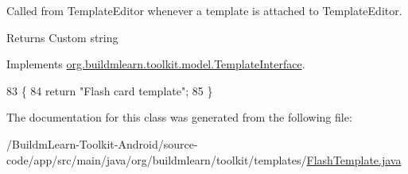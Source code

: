 Called from Template\-Editor whenever a template is attached to Template\-Editor. 

\begin{DoxyReturn}{Returns}
Custom string 
\end{DoxyReturn}


Implements \hyperlink{interfaceorg_1_1buildmlearn_1_1toolkit_1_1model_1_1TemplateInterface_af511bc9b58d176182a53397494d14238}{org.\-buildmlearn.\-toolkit.\-model.\-Template\-Interface}.


\begin{DoxyCode}
83                              \{
84         \textcolor{keywordflow}{return} \textcolor{stringliteral}{"Flash card template"};
85     \}
\end{DoxyCode}


The documentation for this class was generated from the following file\-:\begin{DoxyCompactItemize}
\item 
/\-Buildm\-Learn-\/\-Toolkit-\/\-Android/source-\/code/app/src/main/java/org/buildmlearn/toolkit/templates/\hyperlink{FlashTemplate_8java}{Flash\-Template.\-java}\end{DoxyCompactItemize}
